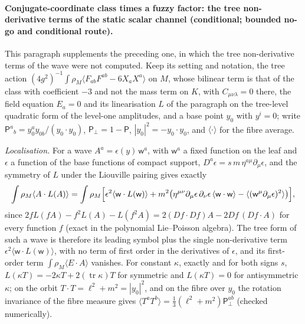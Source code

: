 \paragraph{Conjugate-coordinate class times a fuzzy factor: the tree non-derivative terms of the static scalar channel (conditional; bounded no-go and conditional route).}
This paragraph supplements the preceding one, in which the tree non-derivative terms of the wave were not computed. Keep its setting and notation, the tree action \((4g^2)^{-1}\int\rho_M\langle F_{ab}F^{ab}-6X_aX^a\rangle\) on \(M\), whose bilinear term is that of the class with coefficient \(-3\) and not the mass term on \(K\), with \(C_{\mu\nu\lambda}=0\) there, the field equation \(E_a=0\) and its linearisation \(L\) of the paragraph on the tree-level quadratic form of the level-one amplitudes, and a base point \(y_0\) with \(y^i=0\); write \(\mathsf P^a{}_b=y_0^ay_{0b}/(y_0\cdot y_0)\), \(\mathsf P_\perp=1-\mathsf P\), \(|y_0|^2=-y_0\cdot y_0\), and \(\langle\cdot\rangle\) for the fibre average.

\emph{Localisation.} For a wave \(A^a=\epsilon(y)\,\mathsf w^a\), with \(\mathsf w^a\) a fixed function on the leaf and \(\epsilon\) a function of the base functions of compact support, \(D^a\epsilon=s\,m\,\eta^{a\mu}\partial_\mu\epsilon\), and the symmetry of \(L\) under the Liouville pairing gives exactly
\[
\int\rho_M\langle A\cdot L(A)\rangle=\int\rho_M\Bigl[\epsilon^2\langle\mathsf w\cdot L(\mathsf w)\rangle+m^2\bigl(\eta^{\mu\nu}\partial_\mu\epsilon\,\partial_\nu\epsilon\,\langle\mathsf w\cdot\mathsf w\rangle-\langle(\mathsf w^\mu\partial_\mu\epsilon)^2\rangle\bigr)\Bigr],
\]
since \(2fL(fA)-f^2L(A)-L(f^2A)=2(Df\cdot Df)A-2Df\,(Df\cdot A)\) for every function \(f\) (exact in the polynomial Lie--Poisson algebra). The tree form of such a wave is therefore its leading symbol plus the single non-derivative term \(\epsilon^2\langle\mathsf w\cdot L(\mathsf w)\rangle\), with no term of first order in the derivatives of \(\epsilon\), and its first-order term \(\int\rho_M\langle E\cdot A\rangle\) vanishes. For constant \(\kappa\), exactly and for both signs \(s\), \(L(\kappa T)=-2\kappa T+2(\operatorname{tr}\kappa)T\) for symmetric and \(L(\kappa T)=0\) for antisymmetric \(\kappa\); on the orbit \(T\cdot T=\ell^2+m^2=|y_0|^2\), and on the fibre over \(y_0\) the rotation invariance of the fibre measure gives \(\langle T^aT^b\rangle=\tfrac13(\ell^2+m^2)\mathsf P_\perp^{ab}\) (checked numerically).


